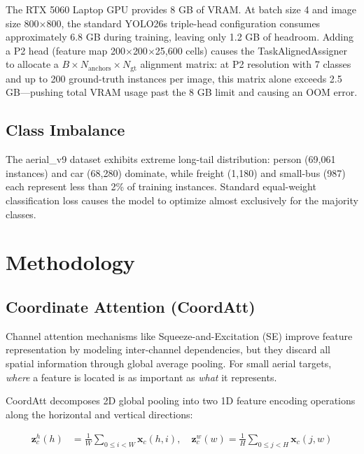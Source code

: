 \documentclass[11pt]{article}
\begin{document}
The RTX 5060 Laptop GPU provides 8 GB of VRAM. At batch size 4 and image size 800$\times$800,
the standard YOLO26s triple-head configuration consumes approximately 6.8 GB during training,
leaving only 1.2 GB of headroom. Adding a P2 head (feature map 200$\times$200$\times$25,600 cells)
causes the TaskAlignedAssigner to allocate a $B \times N_{\text{anchors}} \times N_{\text{gt}}$
alignment matrix: at P2 resolution with 7 classes and up to 200 ground-truth instances per image,
this matrix alone exceeds 2.5 GB—pushing total VRAM usage past the 8 GB limit and causing an OOM
error.

\subsection{Class Imbalance}

The aerial\_v9 dataset exhibits extreme long-tail distribution: person (69,061 instances) and
car (68,280) dominate, while freight (1,180) and small-bus (987) each represent less than 2\%
of training instances. Standard equal-weight classification loss causes the model to optimize
almost exclusively for the majority classes.

\section{Methodology}

\subsection{Coordinate Attention (CoordAtt)}

Channel attention mechanisms like Squeeze-and-Excitation (SE) improve feature representation by
modeling inter-channel dependencies, but they discard all spatial information through global
average pooling. For small aerial targets, \textit{where} a feature is located is as important
as \textit{what} it represents.

CoordAtt \cite{hou2021coordinate} decomposes 2D global pooling into two 1D feature encoding
operations along the horizontal and vertical directions:

\begin{align}
    \mathbf{z}^h_c(h) &= \frac{1}{W} \sum_{0 \leq i < W} \mathbf{x}_c(h, i), \quad
    \mathbf{z}^w_c(w) = \frac{1}{H} \sum_{0 \leq j < H} \mathbf{x}_c(j, w)
\end{align}
\end{document}

